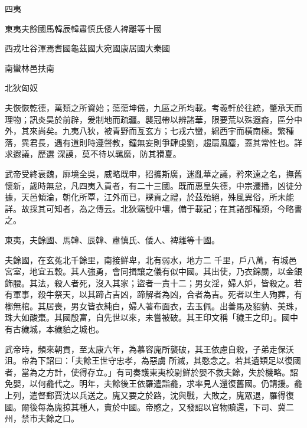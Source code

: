 
\begin{pinyinscope}

 四夷



 東夷夫餘國馬韓辰韓肅慎氏倭人裨離等十國



 西戎吐谷渾焉耆國龜茲國大宛國康居國大秦國



 南蠻林邑扶南



 北狄匈奴



 夫恢恢乾德，萬類之所資始；蕩蕩坤儀，九區之所均載。考羲軒於往統，肇承天而理物；訊炎昊於前辟，爰制地而疏疆。襲冠帶以辨諸華，限要荒以殊遐裔，區分中外，其來尚矣。九夷八狄，被青野而亙玄方；七戎六蠻，綿西宇而橫南極。繁種落，異君長，遇有道則時遵聲教，鐘無妄則爭肆虔劉，趨扇風塵，蓋其常性也。詳求遐議，歷選
 深謨，莫不待以羈縻，防其猾夏。



 武帝受終衰魏，廓境全吳，威略既申，招攜斯廣，迷亂華之議，矜來遠之名，撫舊懷新，歲時無怠，凡四夷入貢者，有二十三國。既而惠皇失德，中宗遷播，凶徒分據，天邑傾淪，朝化所覃，江外而已，賝貢之禮，於茲殆絕，殊風異俗，所未能詳。故採其可知者，為之傳云。北狄竊號中壤，備于載記；在其諸部種類，今略書之。



 東夷，夫餘國、馬韓、辰韓、肅慎氏、倭人、裨離等十國。



 夫餘國，在玄菟北千餘里，南接鮮卑，北有弱水，地方二
 千里，戶八萬，有城邑宮室，地宜五穀。其人強勇，會同揖讓之儀有似中國。其出使，乃衣錦罽，以金銀飾腰。其法，殺人者死，沒入其家；盜者一責十二；男女淫，婦人妒，皆殺之。若有軍事，殺牛祭天，以其蹄占吉凶，蹄解者為凶，合者為吉。死者以生人殉葬，有槨無棺。其居喪，男女皆衣純白，婦人著布面衣，去玉佩。出善馬及貂豽、美珠，珠大如酸棗。其國殷富，自先世以來，未嘗被破。其王印文稱「穢王之印」。國中有古穢城，本穢貃之城也。



 武帝時，頻來朝貢，至太康六年，為慕容廆所襲破，其王依慮自殺，子弟走保沃沮。帝為下詔曰：「夫餘王世守忠孝，為惡虜
 所滅，其愍念之。若其遺類足以復國者，當為之方計，使得存立。」有司奏護東夷校尉鮮於嬰不救夫餘，失於機略。詔免嬰，以何龕代之。明年，夫餘後王依羅遣詣龕，求率見人還復舊國。仍請援。龕上列，遣督郵賈沈以兵送之。廆又要之於路，沈與戰，大敗之，廆眾退，羅得復國。爾後每為廆掠其種人，賣於中國。帝愍之，又發詔以官物贖還，下司、冀二州，禁市夫餘之口。




\end{pinyinscope}
